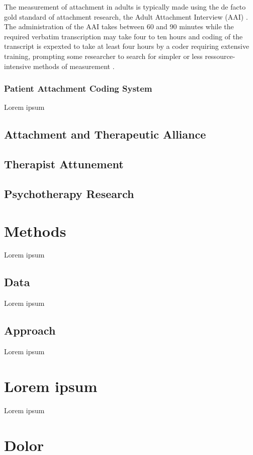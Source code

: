 \documentclass[12pt]{report}
\begin{document}
The measurement of attachment in adults is typically made using the de facto gold standard of attachment research, the Adult Attachment Interview (AAI) \cite{AAITest, Talia2019, haltigan2014adult}. The administration of the AAI takes between 60 and 90 minutes while the required verbatim transcription may take four to ten hours and coding of the transcript is expexted to take at least four hours by a coder requiring extensive training, prompting some researcher to search for simpler or less ressource-intensive methods of measurement \cite{Haas1994}.

\subsection{Patient Attachment Coding System}
Lorem ipsum \cite{Talia2017}
\section{Attachment and Therapeutic Alliance}

\section{Therapist Attunement}

\section{Psychotherapy Research}

\chapter{Methods}
Lorem ipsum

\section{Data}
Lorem ipsum

\section{Approach}
Lorem ipsum



\appendix
\chapter{Lorem ipsum}
Lorem ipsum

\chapter{Dolor}
\end{document}
